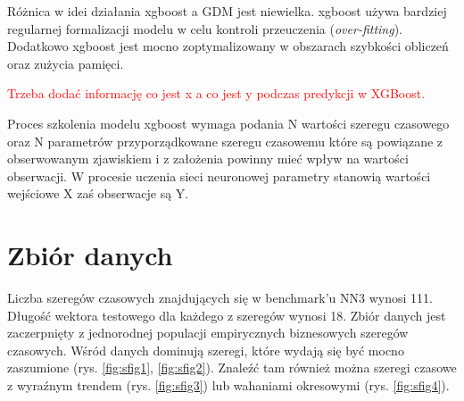 \documentclass[11pt]{report}
\begin{document}
Różnica w idei działania xgboost a GDM jest niewielka.
xgboost używa bardziej regularnej formalizacji modelu w celu kontroli przeuczenia (\textit{over-fitting}).
Dodatkowo xgboost jest mocno zoptymalizowany w obszarach szybkości obliczeń oraz zużycia pamięci.

\textcolor{red}{Trzeba dodać informację co jest x a co jest y podczas predykcji w XGBoost.}

Proces szkolenia modelu xgboost wymaga podania N wartości szeregu czasowego oraz N parametrów przyporządkowane szeregu czasowemu które są powiązane z obserwowanym zjawiskiem i z założenia powinny mieć wpływ na wartości obserwacji.
W procesie uczenia sieci neuronowej parametry stanowią wartości wejściowe X zaś obserwacje są Y.


\section{Zbiór danych}
Liczba szeregów czasowych znajdujących się w benchmark'u NN3 wynosi 111.
Długość wektora testowego dla każdego z szeregów wynosi 18.
Zbiór danych jest zaczerpnięty z jednorodnej populacji empirycznych biznesowych szeregów czasowych.
Wśród danych dominują szeregi, które wydają się być mocno zaszumione (rys. \ref{fig:sfig1}, \ref{fig:sfig2}).
Znaleźć tam również można szeregi czasowe z wyraźnym trendem (rys. \ref{fig:sfig3}) lub wahaniami okresowymi (rys. \ref{fig:sfig4}).
\end{document}
